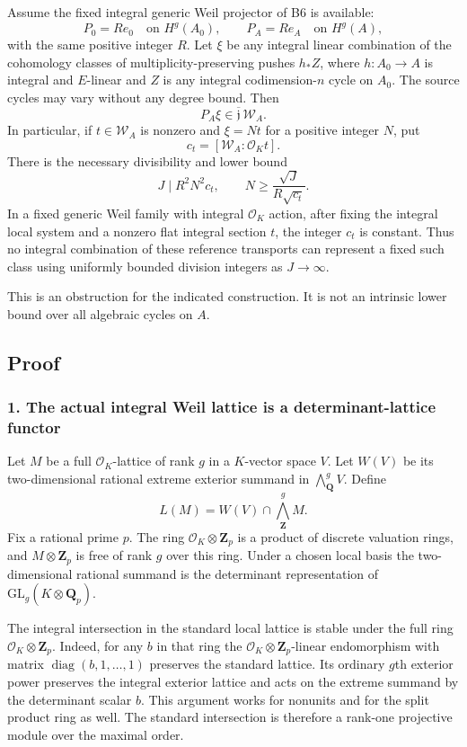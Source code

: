 Assume the fixed integral generic Weil projector of B6 is available: \[
 P_0=Re_0\quad\text{on }H^g(A_0),\qquad
 P_A=Re_A\quad\text{on }H^g(A),
\] with the same positive integer \(R\). Let \(\xi\) be any integral linear combination of the cohomology classes of multiplicity-preserving pushes \(h_*Z\), where \(h:A_0\to A\) is integral and \(E\)-linear and \(Z\) is any integral codimension-\(n\) cycle on \(A_0\). The source cycles may vary without any degree bound. Then \[
 P_A\xi\in\overline{\mathfrak j}\,\mathscr W_A.
\tag{B23.6}
\] In particular, if \(t\in\mathscr W_A\) is nonzero and \(\xi=Nt\) for a positive integer \(N\), put \[
 c_t=[\mathscr W_A:\mathcal O_Kt].
\] There is the necessary divisibility and lower bound \[
 J\mid R^2N^2c_t,
 \qquad
 N\ge\frac{\sqrt J}{R\sqrt{c_t}}.
\tag{B23.7}
\] In a fixed generic Weil family with integral \(\mathcal O_K\) action, after fixing the integral local system and a nonzero flat integral section \(t\), the integer \(c_t\) is constant. Thus no integral combination of these reference transports can represent a fixed such class using uniformly bounded division integers as \(J\to\infty\).

This is an obstruction for the indicated construction. It is not an intrinsic lower bound over all algebraic cycles on \(A\).

\subsection{Proof}\label{proof}

\subsubsection{1. The actual integral Weil lattice is a determinant-lattice functor}\label{the-actual-integral-weil-lattice-is-a-determinant-lattice-functor}

Let \(M\) be a full \(\mathcal O_K\)-lattice of rank \(g\) in a \(K\)-vector space \(V\). Let \(W(V)\) be its two-dimensional rational extreme exterior summand in \(\bigwedge^g_{\mathbf Q}V\). Define \[
 L(M)=W(V)\cap\bigwedge^g_{\mathbf Z}M.
\] Fix a rational prime \(p\). The ring \(\mathcal O_K\otimes\mathbf Z_p\) is a product of discrete valuation rings, and \(M\otimes\mathbf Z_p\) is free of rank \(g\) over this ring. Under a chosen local basis the two-dimensional rational summand is the determinant representation of \(\mathrm{GL}_g(K\otimes\mathbf Q_p)\).

The integral intersection in the standard local lattice is stable under the full ring \(\mathcal O_K\otimes\mathbf Z_p\). Indeed, for any \(b\) in that ring the \(\mathcal O_K\otimes\mathbf Z_p\)-linear endomorphism with matrix \(\operatorname{diag}(b,1,\ldots,1)\) preserves the standard lattice. Its ordinary \(g\)th exterior power preserves the integral exterior lattice and acts on the extreme summand by the determinant scalar \(b\). This argument works for nonunits and for the split product ring as well. The standard intersection is therefore a rank-one projective module over the maximal order.

